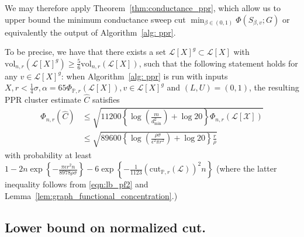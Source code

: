 \documentclass[11pt,twoside]{article}
\newcommand{\set}[1]{\left\{#1\right\}}
\newcommand{\vol}{\mathrm{vol}}
\newcommand{\cut}{\mathrm{cut}}
\newcommand{\1}{\mathbf{1}}
\newcommand{\Xbf}{X}             %
\newcommand{\Pbb}{\mathbb{P}}
\begin{document}
We may therefore apply Theorem~\ref{thm:conductance_ppr}, which allow us to upper bound the minimum conductance sweep cut $\min_{\beta \in (0,1)}\Phi(S_{\beta,v};G)$ or equivalently the output of Algorithm~\ref{alg: ppr}.

To be precise, we have that there exists a set $\mathcal{L}[\Xbf]^g \subset \mathcal{L}[\Xbf]$ with $\vol_{n,r}(\mathcal{L}[\Xbf]^g) \geq \frac{5}{6} \vol_{n,r}(\mathcal{L}[\Xbf])$, such that the following statement holds for any $v \in \mathcal{L}[\Xbf]^g$: when Algorithm~\ref{alg: ppr} is run with inputs $\Xbf, r < \frac{1}{4}\sigma,\alpha = 65 \Phi_{\Pbb,r}(\mathcal{L}[\Xbf]),v \in \mathcal{L}[\Xbf]^g$ and $(L,U) = (0,1)$, the resulting PPR cluster estimate $\widehat{C}$ satisfies
\begin{align}
\Phi_{n,r}(\widehat{C}) & \leq \sqrt{11200\left\{\log\left(\frac{m}{d_{\min}^2}\right) + \log 20\right\} \Phi_{n,r}(\mathcal{L[X]})} \nonumber \\
& \leq \sqrt{89600\left\{\log\left(\frac{\rho \sigma}{\epsilon^2 \pi r^2}\right) + \log 20\right\} \frac{r}{\rho}} \label{eqn:lb_pf4} 
\end{align}
with probability at least $1 - 2n\exp\set{-\frac{\pi\epsilon r^2 n}{8978 \rho \sigma}} - 6 \exp\set{-\frac{1}{1123}(\cut_{\Pbb,r}(\mathcal{L}))^2n}$ (where the latter inequality follows from \eqref{eqn:lb_pf2} and Lemma~\ref{lem:graph_functional_concentration}.)

\subsection{Lower bound on normalized cut.}
\end{document}
